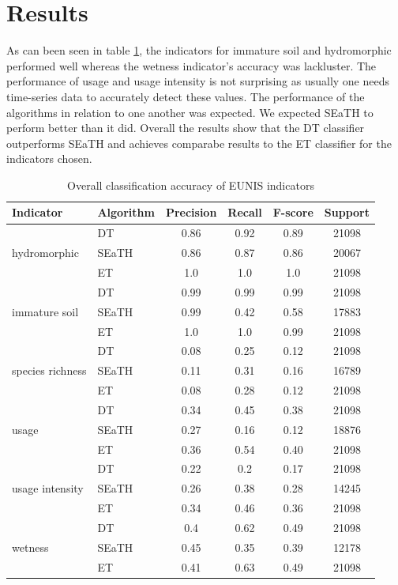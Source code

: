 \documentclass[authoryear, review,12pt,number]{elsarticle}
\begin{document}
\section{Results}
As can been seen in table \ref{tab_accuracy_indicators}, the indicators for
immature soil and hydromorphic performed well whereas the wetness indicator's
accuracy was lackluster. The performance of usage and usage intensity is not
surprising as usually one needs time-series data to accurately detect these
values. The performance of the algorithms in relation to one another was
expected. We expected SEaTH to perform better than it did. Overall the results
show that the DT classifier outperforms SEaTH and achieves comparabe results to
the ET classifier for the indicators chosen. 
\begin{table}
    \centering
    \begin{tabular}{l l c c c c}
    Indicator & Algorithm & Precision & Recall & F-score & 
    Support\\
    \hline
    \multirow{3}{*}{hydromorphic}
    & DT & 0.86 & 0.92 & 0.89 & 21098\\
    & SEaTH & 0.86 & 0.87 & 0.86 & 20067\\
    & ET & 1.0 & 1.0 & 1.0 & 21098\\
    \cline{2-6}
    \multirow{3}{*}{immature soil}
    & DT & 0.99 & 0.99 & 0.99 & 21098\\
    & SEaTH & 0.99 & 0.42 & 0.58 & 17883\\
    & ET & 1.0 & 1.0 & 0.99 & 21098\\
    \cline{2-6}
    \multirow{3}{*}{species richness}
    & DT & 0.08 & 0.25 & 0.12 & 21098\\
    & SEaTH & 0.11 & 0.31 & 0.16 & 16789\\
    & ET & 0.08 & 0.28 & 0.12 & 21098\\
    \cline{2-6}
    \multirow{3}{*}{usage}
    & DT & 0.34 & 0.45 & 0.38 & 21098\\
    & SEaTH & 0.27 & 0.16 & 0.12 & 18876\\
    & ET & 0.36 & 0.54 & 0.40 & 21098\\
    \cline{2-6}
    \multirow{3}{*}{usage intensity}
    & DT & 0.22 & 0.2 & 0.17 & 21098\\
    & SEaTH & 0.26 & 0.38 & 0.28 & 14245\\
    & ET & 0.34 & 0.46 & 0.36 & 21098\\
    \cline{2-6}
    \multirow{3}{*}{wetness}
    & DT & 0.4 & 0.62 & 0.49 & 21098\\
    & SEaTH & 0.45 & 0.35 & 0.39 & 12178\\
    & ET & 0.41 & 0.63 & 0.49 & 21098\\
    \end{tabular}
    \caption{Overall classification accuracy of EUNIS indicators}
    \label{tab_accuracy_indicators}
\end{table}
\end{document}

